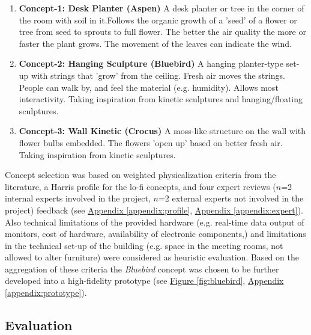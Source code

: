 \begin{enumerate}
  \item \textbf{Concept-1: Desk Planter (Aspen)}
      A desk planter or tree in the corner of the room with soil in it.Follows the organic growth of a 'seed' of a flower or tree from seed to sprouts to full flower. The better the air quality the more or faster the plant grows. The movement of the leaves can indicate the wind.

  \item \textbf{Concept-2: Hanging Sculpture (Bluebird)}
      A hanging planter-type set-up with strings that 'grow' from the ceiling. Fresh air moves the strings. People can walk by, and feel the material (e.g. humidity). Allows most interactivity. Taking inspiration from kinetic sculptures and hanging/floating sculptures.

  \item \textbf{Concept-3: Wall Kinetic (Crocus)}
      A moss-like structure on the wall with flower bulbs embedded. The flowers 'open up' based on better fresh air. Taking inspiration from kinetic sculptures.
\end{enumerate}


Concept selection was based on weighted physicalization criteria from the literature, a Harris profile for the lo-fi concepts, and four expert reviews ($n$=2 internal experts involved in the project, $n$=2 external experts not involved in the project) feedback (see \hyperref[appendix:profile]{Appendix \ref*{appendix:profile}}, \hyperref[appendix:expert]{Appendix \ref*{appendix:expert}}). Also technical limitations of the provided hardware (e.g. real-time data output of monitors, cost of hardware, availability of electronic components,) and limitations in the technical set-up of the building (e.g. space in the meeting rooms, not allowed to alter furniture) were considered as heuristic evaluation. Based on the aggregation of these criteria the \textit{Bluebird} concept was chosen to be further developed into a high-fidelity prototype (see \hyperref[fig:bluebird]{Figure \ref*{fig:bluebird}}, \hyperref[appendix:prototype]{Appendix \ref*{appendix:prototype}}).

\subsection{Evaluation}
\label{sec:evaluation}

